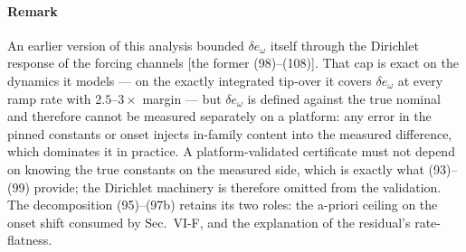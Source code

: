 \documentclass[10pt]{article}
\begin{document}
\paragraph*{Remark}
An earlier version of this analysis bounded $\delta e_\omega$
itself through the Dirichlet response of the forcing channels
[the former (98)--(108)]. That cap is exact on the dynamics it
models --- on the exactly integrated tip-over it covers
$\delta e_\omega$ at every ramp rate with $2.5$--$3\times$ margin
--- but $\delta e_\omega$ is defined against the true nominal and
therefore cannot be measured separately on a platform: any error
in the pinned constants or onset injects in-family content into
the measured difference, which dominates it in practice. A
platform-validated certificate must not depend on knowing the true
constants on the measured side, which is exactly what (93)--(99)
provide; the Dirichlet machinery is therefore omitted from the
validation. The decomposition (95)--(97b) retains its two roles:
the a-priori ceiling on the onset shift consumed by Sec.~VI-F, and
the explanation of the residual's rate-flatness.
\end{document}
